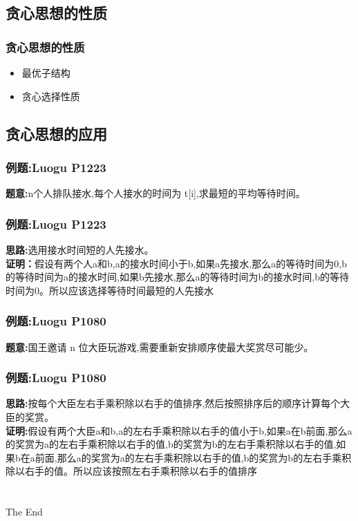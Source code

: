\documentclass{beamer}
\begin{document}
\subsection{贪心思想的性质}
\begin{frame}
\frametitle{贪心思想的性质}
\begin{itemize}
    \item 最优子结构
    \item 贪心选择性质
\end{itemize}
\end{frame}

\subsection{贪心思想的应用}
\begin{frame}

    \frametitle{例题:Luogu P1223}
    \textbf{题意:}n个人排队接水,每个人接水的时间为 t[i],求最短的平均等待时间。  

\end{frame}

\begin{frame}
\frametitle{例题:Luogu P1223}
\textbf{思路:}选用接水时间短的人先接水。
\\
\textbf{证明：}假设有两个人a和b,a的接水时间小于b,如果a先接水,那么a的等待时间为0,b的等待时间为a的接水时间,如果b先接水,那么a的等待时间为b的接水时间,b的等待时间为0。所以应该选择等待时间最短的人先接水
\end{frame}

\begin{frame}
\frametitle{例题:Luogu P1080}
\textbf{题意:}国王邀请 n 位大臣玩游戏,需要重新安排顺序使最大奖赏尽可能少。  

\end{frame}

\begin{frame}
\frametitle{例题:Luogu P1080}
\textbf{思路:}按每个大臣左右手乘积除以右手的值排序,然后按照排序后的顺序计算每个大臣的奖赏。
\\
\textbf{证明:}假设有两个大臣a和b,a的左右手乘积除以右手的值小于b,如果a在b前面,那么a的奖赏为a的左右手乘积除以右手的值,b的奖赏为b的左右手乘积除以右手的值,如果b在a前面,那么a的奖赏为a的左右手乘积除以右手的值,b的奖赏为b的左右手乘积除以右手的值。所以应该按照左右手乘积除以右手的值排序
\end{frame}

\section{}
\begin{frame}{}
    \centering
    \Huge The End
\end{frame}
\end{document}
